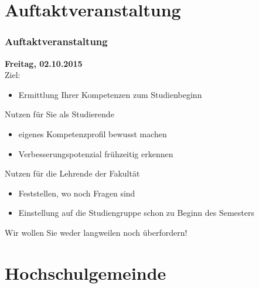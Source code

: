 \documentclass{beamer}
\begin{document}
    \section{Auftaktveranstaltung}
    
    \begin{frame} 
    	\frametitle{Auftaktveranstaltung}
    	\textbf{Freitag, 02.10.2015}\\
    	Ziel:
    	\begin{itemize}
    		\item Ermittlung Ihrer Kompetenzen zum Studienbeginn
    	\end{itemize}
    	\bigskip
    	Nutzen für Sie als Studierende
    	\begin{itemize}
    		\item eigenes Kompetenzprofil bewusst machen
    		\item Verbesserungspotenzial frühzeitig erkennen
        \end{itemize}
        \bigskip
        Nutzen für die Lehrende der Fakultät
        \begin{itemize}
        	\item Feststellen, wo noch Fragen sind
        	\item Einstellung auf die Studiengruppe schon zu Beginn des Semesters
        \end{itemize}
        Wir wollen Sie weder langweilen noch überfordern!
    \end{frame}
    
    \section{Hochschulgemeinde}
    
\end{document}
